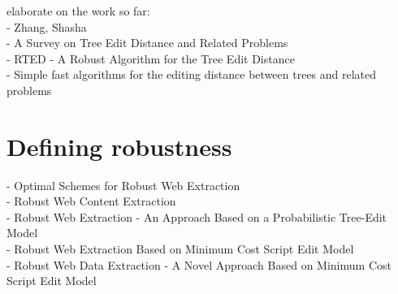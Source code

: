 elaborate on the work so far:\\
- Zhang, Shasha\\
- A Survey on Tree Edit Distance and Related Problems\\
- RTED - A Robust Algorithm for the Tree Edit Distance\\
- Simple fast algorithms for the editing distance between trees and related problems\\


\section{Defining robustness}

- Optimal Schemes for Robust Web Extraction\\
- Robust Web Content Extraction\\
- Robust Web Extraction - An Approach Based on a Probabilistic Tree-Edit Model\\
- Robust Web Extraction Based on Minimum Cost Script Edit Model\\
- Robust Web Data Extraction - A Novel Approach Based on Minimum Cost Script Edit Model\\

